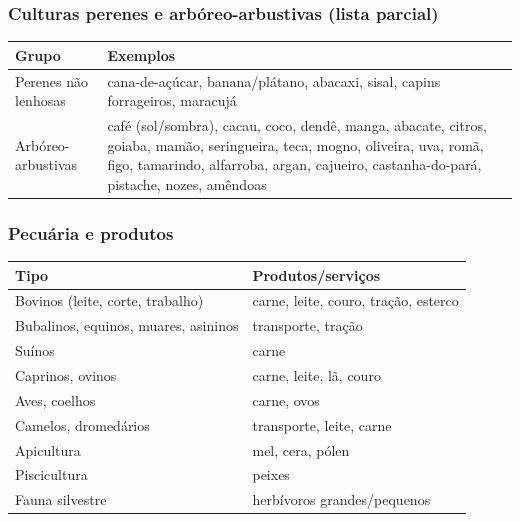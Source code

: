 \subsubsection{Culturas perenes e arbóreo-arbustivas (lista parcial)}\label{culturas-perenes-e-arbuxf3reo-arbustivas-lista-parcial}

{
\begin{longtable}[]{@{}
  >{\raggedright\arraybackslash}p{}
  >{\raggedright\arraybackslash}p{}@{}}
\toprule\noalign{}
\begin{minipage}[b]{\linewidth}\raggedright
Grupo
\end{minipage} & \begin{minipage}[b]{\linewidth}\raggedright
Exemplos
\end{minipage} \\
\midrule\noalign{}
\endhead
\bottomrule\noalign{}
\endlastfoot
Perenes não lenhosas & cana-de-açúcar, banana/plátano, abacaxi, sisal, capins forrageiros, maracujá \\
Arbóreo-arbustivas & café (sol/sombra), cacau, coco, dendê, manga, abacate, citros, goiaba, mamão, seringueira, teca, mogno, oliveira, uva, romã, figo, tamarindo, alfarroba, argan, cajueiro, castanha-do-pará, pistache, nozes, amêndoas \\
\end{longtable}
}

\subsubsection{Pecuária e produtos}\label{pecuuxe1ria-e-produtos}

{
\begin{longtable}[]{@{}
  >{\raggedright\arraybackslash}p{}
  >{\raggedright\arraybackslash}p{}@{}}
\toprule\noalign{}
\begin{minipage}[b]{\linewidth}\raggedright
Tipo
\end{minipage} & \begin{minipage}[b]{\linewidth}\raggedright
Produtos/serviços
\end{minipage} \\
\midrule\noalign{}
\endhead
\bottomrule\noalign{}
\endlastfoot
Bovinos (leite, corte, trabalho) & carne, leite, couro, tração, esterco \\
Bubalinos, equinos, muares, asininos & transporte, tração \\
Suínos & carne \\
Caprinos, ovinos & carne, leite, lã, couro \\
Aves, coelhos & carne, ovos \\
Camelos, dromedários & transporte, leite, carne \\
Apicultura & mel, cera, pólen \\
Piscicultura & peixes \\
Fauna silvestre & herbívoros grandes/pequenos \\
\end{longtable}
}

